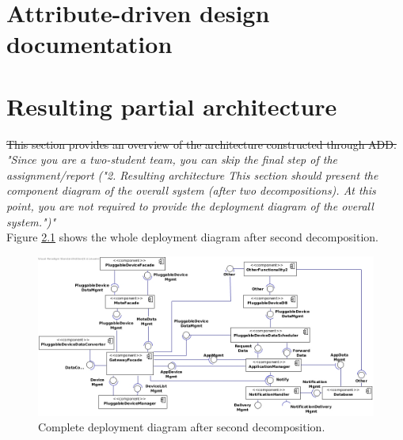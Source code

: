 \documentclass[english]{sareport}
\begin{document}
\maketitle

\tableofcontents

\chapter{Attribute-driven design documentation}\label{sec:add}

\newpage


\chapter{Resulting partial architecture}\label{sec:architecture}
\sout{This section provides an overview of the architecture constructed through ADD.}\\
\textit{"Since you are a two-student team, you can skip the final step of the
assignment/report ("2. Resulting architecture This section should present
the component diagram of the overall system (after two decompositions).
At this point, you are not required to provide the deployment diagram
of the overall system.")"}\\

\noindent Figure \ref{comp-whole} shows the whole deployment diagram after
second decomposition.

\begin{figure}
    \centering
    \includegraphics[width=1.00\textwidth]{component-diagram-whole}
    \caption{Complete deployment diagram after second decomposition.}\label{comp-whole}
\end{figure}
\end{document}
